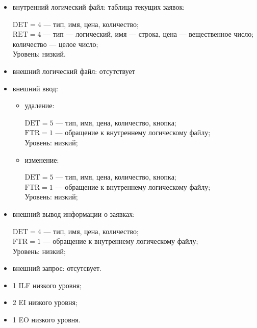 \begin{itemize}
    \item внутренний логический файл: таблица текущих заявок:

        $\text{DET} = 4$ --- тип, имя, цена, количество;\\
        $\text{RET} = 4$ --- тип --- логический, имя --- строка, цена --- вещественное число; количество --- целое число;\\
        Уровень: низкий.
    
    \item внешний логический файл: отсутствует
    \item внешний ввод:
        \begin{itemize}
            \item удаление:
            
                $\text{DET} = 5$ --- тип, имя, цена, количество, кнопка; \\
                $\text{FTR} = 1$ --- обращение к внутреннему логическому файлу;\\
                Уровень: низкий;
                
            \item изменение:

                $\text{DET} = 5$ --- тип, имя, цена, количество, кнопка; \\
                $\text{FTR} = 1$ --- обращение к внутреннему логическому файлу;\\
                Уровень: низкий;
                
        \end{itemize}
    \item внешний вывод информации о заявках:

        $\text{DET} = 4$ --- тип, имя, цена, количество; \\
        $\text{FTR} = 1$ --- обращение к внутреннему логическому файлу;\\
        Уровень: низкий;
    
    \item внешний запрос: отсутсвует.
\end{itemize}

\begin{itemize}
    \item 1 ILF низкого уровня;
    \item 2 EI низкого уровня;
    \item 1 EO низкого уровня.
\end{itemize}

